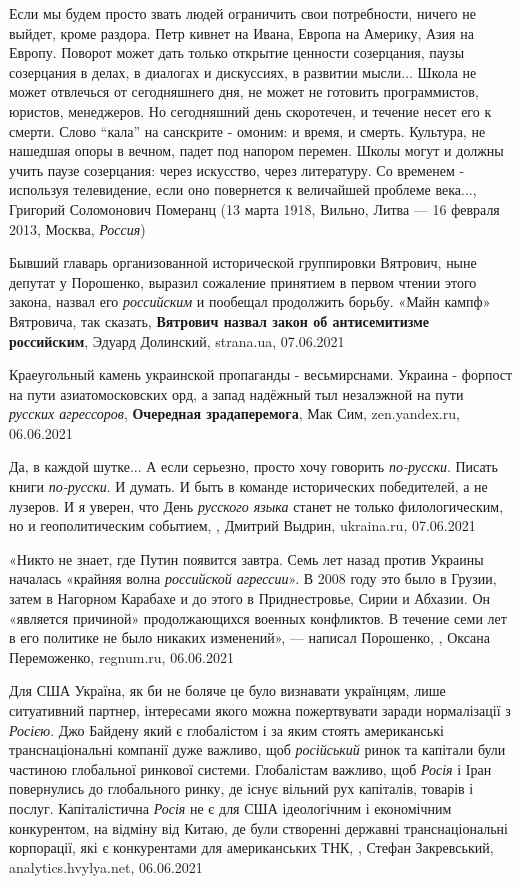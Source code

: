Если мы будем просто звать людей ограничить свои потребности, ничего не выйдет,
кроме раздора. Петр кивнет на Ивана, Европа на Америку, Азия на Европу. Поворот
может дать только открытие ценности созерцания, паузы созерцания в делах, в
диалогах и дискуссиях, в развитии мысли...  Школа не может отвлечься от
сегодняшнего дня, не может не готовить программистов, юристов, менеджеров. Но
сегодняшний день скоротечен, и течение несет его к смерти. Слово \enquote{кала}
на санскрите - омоним: и время, и смерть. Культура, не нашедшая опоры в вечном,
падет под напором перемен.  Школы могут и должны учить паузе созерцания: через
искусство, через литературу. Со временем - используя телевидение, если оно
повернется к величайшей проблеме века...,
Григорий Соломонович Померанц (13 марта 1918, Вильно, Литва — 16 февраля 2013, Москва, \emph{Россия})

Бывший главарь организованной исторической группировки Вятрович, ныне депутат у
Порошенко, выразил сожаление принятием в первом чтении этого закона, назвал его
\emph{российским} и пообещал продолжить борьбу. «Майн кампф» Вятровича, так
сказать, \textbf{Вятрович назвал закон об антисемитизме российским}, Эдуард
Долинский, strana.ua, 07.06.2021

Краеугольный камень украинской пропаганды - весьмирснами. Украина - форпост на
пути азиатомосковских орд, а запад надёжный тыл незалэжной на пути
\emph{русских агрессоров},
\textbf{Очередная зрадаперемога}, Мак Сим, zen.yandex.ru, 06.06.2021

Да, в каждой шутке... А если серьезно, просто хочу говорить \emph{по-русски}.
Писать книги \emph{по-русски}. И думать. И быть в команде исторических
победителей, а не лузеров.  И я уверен, что День \emph{русского языка} станет
не только филологическим, но и геополитическим событием,
, Дмитрий Выдрин, ukraina.ru, 07.06.2021

«Никто не знает, где Путин появится завтра. Семь лет назад против Украины
началась «крайняя волна \emph{российской агрессии}». В 2008 году это было в
Грузии, затем в Нагорном Карабахе и до этого в Приднестровье, Сирии и Абхазии.
Он «является причиной» продолжающихся военных конфликтов. В течение семи лет в
его политике не было никаких изменений», — написал Порошенко,
, Оксана Переможенко, regnum.ru, 06.06.2021

Для США Україна, як би не боляче це було визнавати українцям, лише ситуативний
партнер, інтересами якого можна пожертвувати заради нормалізації з \emph{Росією}. Джо
Байдену який є глобалістом і за яким стоять американські транснаціональні
компанії дуже важливо, щоб \emph{російський} ринок та капітали були частиною
глобальної ринкової системи. Глобалістам важливо, щоб \emph{Росія} і Іран повернулись
до глобального ринку, де існує вільний рух капіталів, товарів і послуг.
Капіталістична \emph{Росія} не є для США ідеологічним і економічним конкурентом, на
відміну від Китаю, де були створенні державні транснаціональні корпорації, які
є конкурентами для американських ТНК,
, Стефан Закревський, analytics.hvylya.net, 06.06.2021

